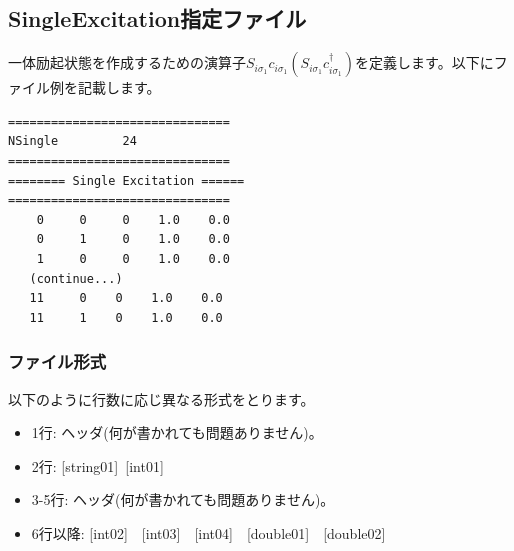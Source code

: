 \newpage
\subsection{{SingleExcitation指定ファイル}}
\label{Subsec:singleexcitation}
一体励起状態を作成するための演算子$S_{i\sigma_1}c_{i\sigma_1}(S_{i\sigma_1}c_{i\sigma_1}^{\dagger})$を定義します。以下にファイル例を記載します。

\begin{minipage}{12.5cm}
\begin{screen}
\begin{verbatim}
===============================
NSingle         24
===============================
======== Single Excitation ======
===============================
    0     0     0    1.0    0.0
    0     1     0    1.0    0.0
    1     0     0    1.0    0.0
   (continue...)
   11     0    0    1.0    0.0
   11     1    0    1.0    0.0
\end{verbatim}
\end{screen}
\end{minipage}

\subsubsection{ファイル形式}
以下のように行数に応じ異なる形式をとります。
 \begin{itemize}
   \item  1行:  ヘッダ(何が書かれても問題ありません)。
   \item  2行:   [string01]~[int01]
   \item  3-5行:  ヘッダ(何が書かれても問題ありません)。
   \item  6行以降: [int02]~~[int03]~~[int04]~~[double01]~~[double02]
  \end{itemize}
